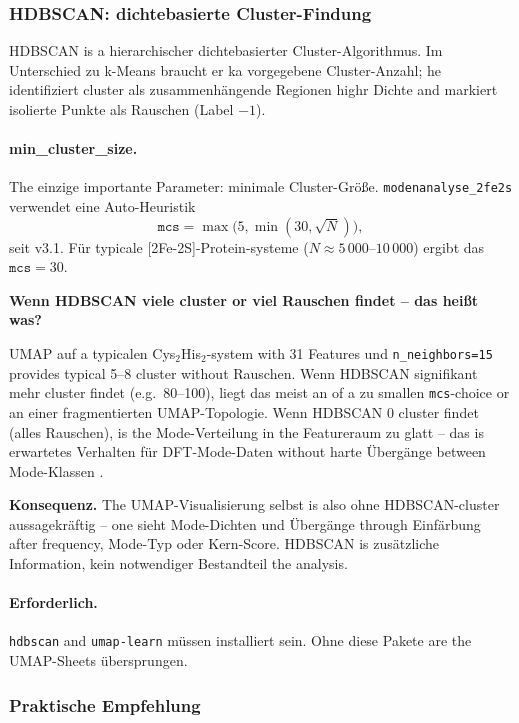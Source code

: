 \documentclass[11pt,a4paper,twoside]{article}
\theoremstyle{remark}
\begin{document}
\subsubsection*{HDBSCAN: dichtebasierte Cluster-Findung}

HDBSCAN \cite{Campello2013,McInnes2017} is a hierarchischer
dichtebasierter Cluster-Algorithmus. Im Unterschied zu k-Means braucht
er ka vorgegebene Cluster-Anzahl; he identifiziert cluster als
zusammenh\"angende Regionen highr Dichte and markiert isolierte
Punkte als Rauschen (Label $-1$).

\paragraph{min\_cluster\_size.} The einzige importante Parameter:
minimale Cluster-Gr\"o\ss e. \texttt{modenanalyse\_2fe2s} verwendet eine
Auto-Heuristik
\[
  \texttt{mcs} = \max\bigl(5, \min(30, \sqrt{N})\bigr),
\]
seit v3.1. F\"ur typicale [2Fe-2S]-Protein-systeme ($N \approx 5\,000$--$10\,000$) ergibt das
$\texttt{mcs} = 30$.

\begin{infobox}
\textbf{Wenn HDBSCAN viele cluster or viel Rauschen findet --
das hei\ss t was?}

UMAP auf a typicalen Cys$_2$His$_2$-system with 31 Features und
\texttt{n\_neighbors=15} provides typical 5--8 cluster without Rauschen.
Wenn HDBSCAN signifikant mehr cluster findet (e.g.\ 80--100), liegt
das meist an of a zu smallen \texttt{mcs}-choice or an einer
fragmentierten UMAP-Topologie. Wenn HDBSCAN 0 cluster findet
(alles Rauschen), is the Mode-Verteilung in the Featureraum zu glatt --
das is erwartetes Verhalten f\"ur DFT-Mode-Daten without harte
\"Uberg\"ange between Mode-Klassen \cite{Campello2013}.

\textbf{Konsequenz.} The UMAP-Visualisierung selbst is also ohne
HDBSCAN-cluster aussagekr\"aftig -- one sieht Mode-Dichten und
\"Uberg\"ange through Einf\"arbung after frequency, Mode-Typ oder
Kern-Score. HDBSCAN is zus\"atzliche Information, kein notwendiger
Bestandteil the analysis.
\end{infobox}

\paragraph{Erforderlich.} \texttt{hdbscan} and \texttt{umap-learn}
m\"ussen installiert sein. Ohne diese Pakete are the UMAP-Sheets
\"ubersprungen.

\subsubsection*{Praktische Empfehlung}
\end{document}

